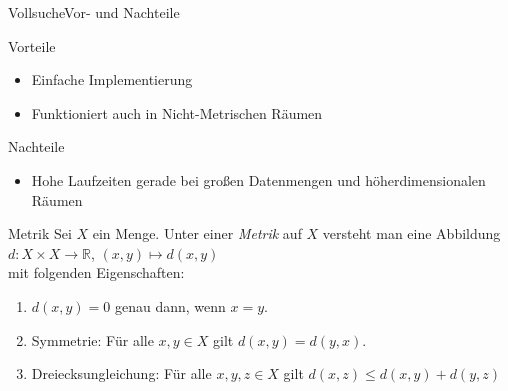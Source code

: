 \documentclass{beamer}
\begin{document}
\begin{frame}{Vollsuche}{Vor- und Nachteile}
 \begin{block}{Vorteile}
  \begin{itemize}
   \item Einfache Implementierung
   \pause
   \item Funktioniert auch in Nicht-Metrischen R\"aumen
  \end{itemize}
 \end{block}
 \pause
 \begin{block}{Nachteile}
  \begin{itemize}
   \item Hohe Laufzeiten gerade bei großen Datenmengen und h\"oherdimensionalen R\"aumen
  \end{itemize}
 \end{block}
\end{frame}

\begin{frame}{Metrik}
  Sei $X$ ein Menge. Unter einer \textit{Metrik} auf $X$ versteht man eine Abbildung\\
  $d:X \times X \to \mathbb{R}$, $(x, y) \mapsto d(x, y)$\\
  mit folgenden Eigenschaften:
 \begin{enumerate}
 \pause
  \item $d(x, y) = 0$ genau dann, wenn $x=y$.
  \pause
  \item Symmetrie: F\"ur alle $x, y \in X$ gilt $d(x, y) = d(y, x)$.
  \pause
  \item Dreiecksungleichung: F\"ur alle $x, y, z \in X$ gilt $d(x, z) \le d(x, y) + d(y,z)$
 \end{enumerate}
 \flushright{\tiny{[Forster, 2006]}}
\end{frame}
\end{document}
